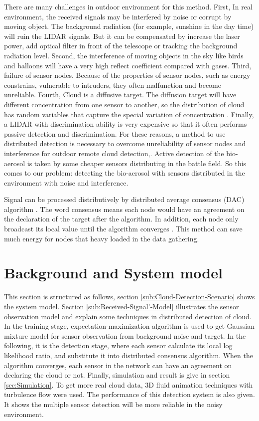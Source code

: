 There are many challenges in outdoor environment for this method.
First, In real environment, the received signals may be interfered
by noise or corrupt by moving object. The background radiation (for
example, sunshine in the day time) will ruin the LIDAR signals. But
it can be compensated by increase the laser power, add optical filter
in front of the telescope or tracking the background radiation level.
Second, the interference of moving objects in the sky like birds and
balloons will have a very high reflect coefficient compared with gases.
Third, failure of sensor nodes. Because of the properties of sensor
nodes, such as energy constrains, vulnerable to intruders, they often
malfunction and become unreliable. Fourth, Cloud is a diffusive target.
The diffusion target will have different concentration from one sensor
to another, so the distribution of cloud has random variables that
capture the special variation of concentration \cite{N.Kh.2004}.
Finally, a LIDAR with discrimination ability is very expensive so
that it often performs passive detection and discrimination. For these
reasons, a method to use distributed detection is necessary to overcome
unreliability of sensor nodes and interference for outdoor remote
cloud detection,. Active detection of the bio-aerosol is taken by
some cheaper sensors distributing in the battle field. So this comes
to our problem: detecting the bio-aerosol with sensors distributed
in the environment with noise and interference. 



Signal can be processed distributively by distributed average consensus
(DAC) algorithm . The word consensus means each node would have an
agreement on the declaration of the target after the algorithm. In
addition, each node only broadcast its local value until the algorithm
converges \cite{Xiao2004}. This method can save much energy for nodes
that heavy loaded in the data gathering. 


\section{Background and System model }

This section is structured as follows, section \ref{sub:Cloud-Detection-Scenario}
shows the system model. Section \ref{sub:Received-Signal'-Model}
illustrates the sensor observation model and explain some techniques
in distributed detection of cloud. In the training stage, expectation-maximization
algorithm is used to get Gaussian mixture model for sensor observation
from background noise and target. In the following, it is the detection
stage, where each sensor calculate its local log likelihood ratio,
and substitute it into distributed consensus algorithm. When the algorithm
converges, each sensor in the network can have an agreement on declaring
the cloud or not. Finally, simulation and result is give in section
\ref{sec:Simulation}. To get more real cloud data, 3D fluid animation
techniques with turbulence flow were used. The performance of this
detection system is also given. It shows the multiple sensor detection
will be more reliable in the noisy environment.


